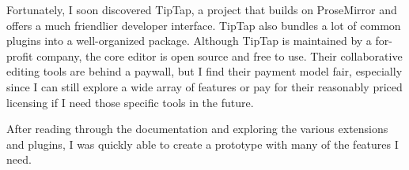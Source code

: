 Fortunately, I soon discovered TipTap, a project that builds on ProseMirror and offers a much friendlier developer interface. TipTap also bundles a lot of common plugins into a well-organized package. Although TipTap is maintained by a for-profit company, the core editor is open source and free to use. Their collaborative editing tools are behind a paywall, but I find their payment model fair, especially since I can still explore a wide array of features or pay for their reasonably priced licensing if I need those specific tools in the future.

After reading through the documentation and exploring the various extensions and plugins, I was quickly able to create a prototype with many of the features I need.


